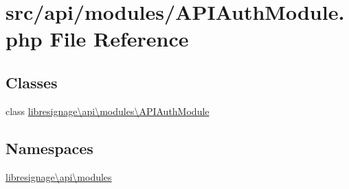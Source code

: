 \hypertarget{APIAuthModule_8php}{}\section{src/api/modules/\+A\+P\+I\+Auth\+Module.php File Reference}
\label{APIAuthModule_8php}
\subsection*{Classes}
\begin{DoxyCompactItemize}
\item 
class \hyperlink{classlibresignage_1_1api_1_1modules_1_1APIAuthModule}{libresignage\textbackslash{}api\textbackslash{}modules\textbackslash{}\+A\+P\+I\+Auth\+Module}
\end{DoxyCompactItemize}
\subsection*{Namespaces}
\begin{DoxyCompactItemize}
\item 
 \hyperlink{namespacelibresignage_1_1api_1_1modules}{libresignage\textbackslash{}api\textbackslash{}modules}
\end{DoxyCompactItemize}
